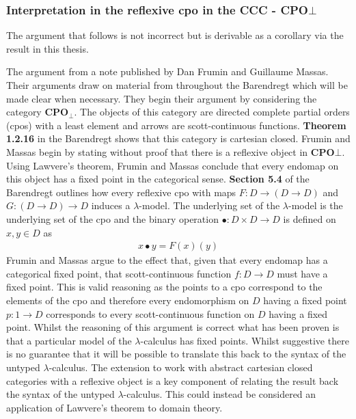 \subsubsection{Interpretation in the reflexive cpo in the CCC -
\textbf{CPO}$\bot$}
The argument that follows is not incorrect but is derivable as a corollary via
the result in this thesis.

The argument from a note published by Dan Frumin and Guillaume
Massas. Their arguments draw on material from throughout the Barendregt
\cite{barendregt1992lambda} which will be made clear when necessary. They begin
their argument by considering the category \textbf{CPO}$_{\bot}$. The objects of
this category are directed complete partial orders (cpos) with a least element
and arrows are scott-continuous functions. \textbf{Theorem 1.2.16} in the
Barendregt shows that this category is cartesian closed. Frumin and Massas begin
by stating without proof that there is a reflexive object in \textbf{CPO}$\bot$.
Using Lawvere's theorem, Frumin and Massas conclude that every endomap on this
object has a fixed point in the categorical sense. \textbf{Section 5.4} of the
Barendregt outlines how every reflexive cpo with maps $F : D \rightarrow (D
\rightarrow D)$ and $G : (D \rightarrow D) \rightarrow D$ induces a
$\lambda$-model. The underlying set of the $\lambda$-model is the underlying set
of the cpo and the binary operation $\bullet : D \times D \rightarrow D$ is
defined on $x , y \in D$ as \begin{align*} x \bullet y = F(x)(y) \end{align*}
Frumin and Massas argue to the effect that, given that every endomap has a
categorical fixed point, that scott-continuous function $f : D \rightarrow D$
must have a fixed point. This is valid reasoning as the points to a cpo
correspond to the elements of the cpo and therefore every endomorphism on $D$
having a fixed point $p : 1 \rightarrow D$ corresponds to every scott-continuous
function on $D$ having a fixed point. Whilst the reasoning of this argument is
correct what has been proven is that a particular model of the
$\lambda$-calculus has fixed points. Whilst suggestive there is no guarantee
that it will be possible to translate this back to the syntax of the untyped
$\lambda$-calculus. The extension to work with abstract cartesian closed
categories with a reflexive object is a key component of relating the result
back the syntax of the untyped $\lambda$-calculus. This could instead be
considered an application of Lawvere's theorem to domain theory.

